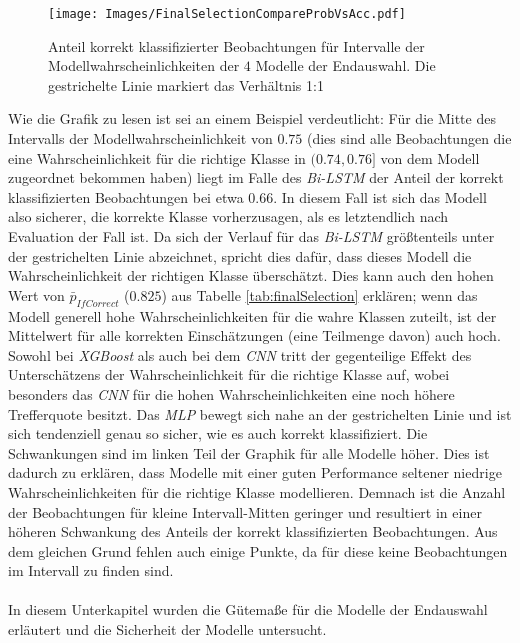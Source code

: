 \documentclass[a4paper,11pt]{article}
\begin{document}
\begin{figure}[ht]
    \centering
\texttt{[image: Images/FinalSelectionCompareProbVsAcc.pdf]} 
\caption{Anteil korrekt klassifizierter Beobachtungen für Intervalle der Modellwahrscheinlichkeiten der $4$ Modelle der Endauswahl. Die gestrichelte Linie markiert das Verhältnis 1:1}
\label{abb:CompareProbVsAcc}
\end{figure}

Wie die Grafik zu lesen ist sei an einem Beispiel verdeutlicht: Für die Mitte des Intervalls der Modellwahrscheinlichkeit von $0.75$ (dies sind alle Beobachtungen die eine Wahrscheinlichkeit für die richtige Klasse in $(0.74,0.76]$ von dem Modell zugeordnet bekommen haben) liegt im Falle des \textit{Bi-LSTM} der Anteil der korrekt klassifizierten Beobachtungen bei etwa $0.66$. In diesem Fall ist sich das Modell also sicherer, die korrekte Klasse vorherzusagen, als es letztendlich nach Evaluation der Fall ist. 
Da sich der Verlauf für das \textit{Bi-LSTM} größtenteils unter der gestrichelten Linie abzeichnet, spricht dies dafür, dass dieses Modell die Wahrscheinlichkeit der richtigen Klasse überschätzt. Dies kann auch den hohen Wert von $\bar{p}_{IfCorrect}$ ($0.825$) aus Tabelle \ref{tab:finalSelection} erklären; wenn das Modell generell hohe Wahrscheinlichkeiten für die wahre Klassen zuteilt, ist der Mittelwert für alle korrekten Einschätzungen (eine Teilmenge davon) auch hoch. Sowohl bei \textit{XGBoost} als auch bei dem \textit{CNN} tritt der gegenteilige Effekt des Unterschätzens der Wahrscheinlichkeit für die richtige Klasse auf, wobei besonders das \textit{CNN} für die hohen Wahrscheinlichkeiten eine noch höhere Trefferquote besitzt. Das \textit{MLP} bewegt sich nahe an der gestrichelten Linie und ist sich tendenziell genau so sicher, wie es auch korrekt klassifiziert. Die Schwankungen sind im linken Teil der Graphik für alle Modelle höher. Dies ist dadurch zu erklären, dass Modelle mit einer guten Performance seltener niedrige Wahrscheinlichkeiten für die richtige Klasse modellieren. Demnach ist die Anzahl der Beobachtungen für kleine Intervall-Mitten geringer und resultiert in einer höheren Schwankung des Anteils der korrekt klassifizierten Beobachtungen. Aus dem gleichen Grund fehlen auch einige Punkte, da für diese keine Beobachtungen im Intervall zu finden sind. \\
\\
In diesem Unterkapitel wurden die Gütemaße für die Modelle der Endauswahl erläutert und die Sicherheit der Modelle untersucht. 
\end{document}
